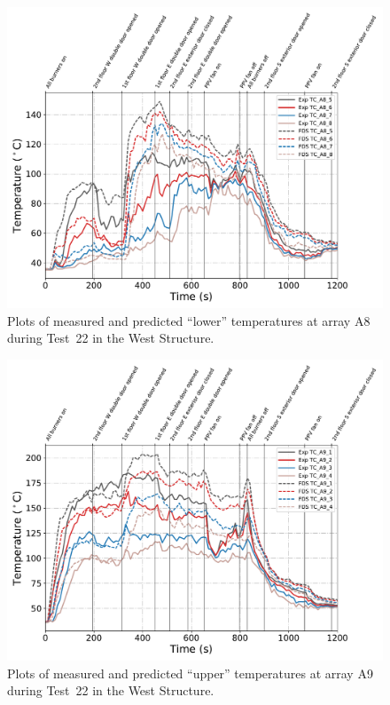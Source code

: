 \begin{figure}[!h]
	\centering
	\includegraphics[width=\columnwidth]{Figures/Plots/Validation/Temperature/Test_22_TC_A8_lower}
	\caption{Plots of measured and predicted ``lower'' temperatures at array A8 during Test~22 in the West Structure.}
	\label{fig:TCA8_lower_data_Test22}
\end{figure}

\begin{figure}[!h]
	\centering
	\includegraphics[width=\columnwidth]{Figures/Plots/Validation/Temperature/Test_22_TC_A9_upper}
	\caption{Plots of measured and predicted ``upper'' temperatures at array A9 during Test~22 in the West Structure.}
	\label{fig:TCA9_upper_data_Test22}
\end{figure}

